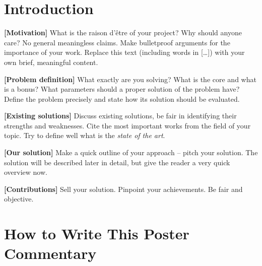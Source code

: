 \documentclass{ExcelAtFIT}
\affiliation{*%
  \href{mailto:herout@vut.cz}{herout@vut.cz},
  \textit{Faculty of Information Technology, Brno University of Technology}}
\begin{document}
\startdocument


\section{Introduction}

\textbf{[Motivation]} What is the raison d'\^{e}tre of your project? Why should anyone care? No general meaningless claims. Make bulletproof arguments for the importance of your work. Replace this text (including words in [\dots]) with your own brief, meaningful content.

\textbf{[Problem definition]} What exactly are you solving? What is the core and what is a bonus? What parameters should a proper solution of the problem have? Define the problem precisely and state how its solution should be evaluated.

\textbf{[Existing solutions]} Discuss existing solutions, be fair in identifying their strengths and weaknesses. Cite the most important works from the field of your topic. Try to define well what is the \textit{state of the art}. 

\textbf{[Our solution]} Make a quick outline of your approach -- pitch your solution.  The solution will be described later in detail, but give the reader a very quick overview now.

\textbf{[Contributions]} Sell your solution. Pinpoint your achievements. Be fair and objective.


\section{How to Write This Poster Commentary}
\label{sec:Introduction}
\end{document}
